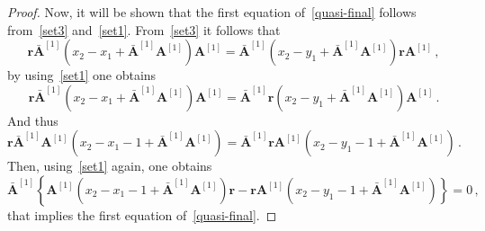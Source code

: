 \documentclass[10pt,a4paper]{amsart}
\newcommand{\OA}{\mathbf{A}}
\newcommand{\OAD}{\mathbf{\bar{A}}}
\begin{document}
\begin{proof}
Now, it will be shown that the first equation of~\eqref{quasi-final} follows from~\eqref{set3} and~\eqref{set1}. From~\eqref{set3} it follows that
\begin{equation}
    	\mathbf{r}{\OAD}^{[1]}(x_{2}-x_{1}+\OAD^{[1]}\OA^{[1]})\OA^{[1]}={\OAD}^{[1]}(x_{2}-y_{1}+\OAD^{[1]}\OA^{[1]})\mathbf{r}\OA^{[1]}\,,
\end{equation}
by using~\eqref{set1} one obtains
\begin{equation}
    	\mathbf{r}{\OAD}^{[1]}(x_{2}-x_{1}+\OAD^{[1]}\OA^{[1]})\OA^{[1]}={\OAD}^{[1]}\mathbf{r}(x_{2}-y_{1}+\OAD^{[1]}\OA^{[1]})\OA^{[1]}\,.
\end{equation}
And thus
\begin{equation}
    	\mathbf{r}{\OAD}^{[1]}\OA^{[1]}(x_{2}-x_{1}-1+\OAD^{[1]}\OA^{[1]})={\OAD}^{[1]}\mathbf{r}\OA^{[1]}(x_{2}-y_{1}-1+\OAD^{[1]}\OA^{[1]})\,.
\end{equation}
Then, using~\eqref{set1} again, one obtains
\begin{equation}
    	{\OAD}^{[1]}\left\{\OA^{[1]}(x_{2}-x_{1}-1+\OAD^{[1]}\OA^{[1]})\mathbf{r}-\mathbf{r}\OA^{[1]}(x_{2}-y_{1}-1+\OAD^{[1]}\OA^{[1]})\right\}=0\,,
\end{equation}
that implies the first equation of~\eqref{quasi-final}.
\end{proof}
\end{document}
